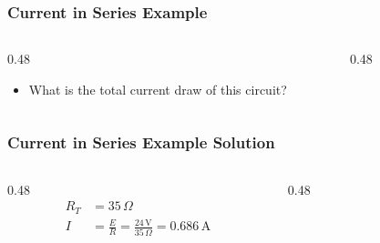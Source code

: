 \begin{frame}
    \frametitle{Current in Series Example}

    \begin{columns}
        \begin{column}{0.48\linewidth}
            \begin{itemize}[<+- | alert@+>]
                \item What is the total current draw of this circuit?
            \end{itemize}
        \end{column}
        \begin{column}{0.48\linewidth}
            \begin{figure}
                \centering
                \resizebox{\columnwidth}{!}{
                    
                }
            \end{figure}
        \end{column}
	\end{columns}
\end{frame}

\begin{frame}
    \frametitle{Current in Series Example Solution}

    \begin{columns}
        \begin{column}{0.48\linewidth}
            \[
                \begin{aligned}
                    R_T&=35\,\Omega\\
                    I&=\frac{E}{R}=\frac{24\,\text{V}}{35\,\Omega}=0.686\,\text{A}
                \end{aligned}
            \]
        \end{column}
        \begin{column}{0.48\linewidth}
            \begin{figure}
                \centering
                \resizebox{\columnwidth}{!}{
                    
                }
            \end{figure}
        \end{column}
	\end{columns}
\end{frame}


